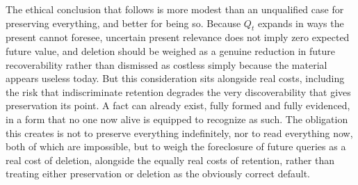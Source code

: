 The ethical conclusion that follows is more modest than an unqualified case for preserving everything, and better for being so. Because $Q_t$ expands in ways the present cannot foresee, uncertain present relevance does not imply zero expected future value, and deletion should be weighed as a genuine reduction in future recoverability rather than dismissed as costless simply because the material appears useless today. But this consideration sits alongside real costs, including the risk that indiscriminate retention degrades the very discoverability that gives preservation its point. A fact can already exist, fully formed and fully evidenced, in a form that no one now alive is equipped to recognize as such. The obligation this creates is not to preserve everything indefinitely, nor to read everything now, both of which are impossible, but to weigh the foreclosure of future queries as a real cost of deletion, alongside the equally real costs of retention, rather than treating either preservation or deletion as the obviously correct default.
